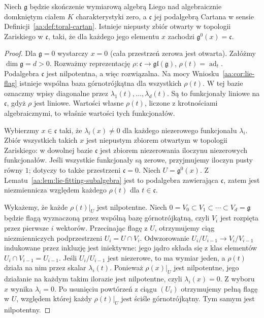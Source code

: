 \begin{twierdzenie}
\label{aa:tw:cartan-generic-fitting}
Niech $\mathfrak g$ będzie skończenie wymiarową algebrą Liego nad algebraicznie domkniętym ciałem $K$ charakterystyki zero, a $\mathfrak c$ jej podalgebrą Cartana w sensie Definicji~\ref{aa:def:toral-cartan}. Istnieje niepusty zbiór otwarty w topologii Zariskiego w $\mathfrak c$, taki, że dla każdego jego elementu $x$ zachodzi
$\mathfrak g^0(x)=\mathfrak c$.
\end{twierdzenie}
\begin{proof}
Dla $\mathfrak g=0$ wystarczy $x=0$ (cała przestrzeń zerowa jest otwarta). Załóżmy $\dim\mathfrak g=d>0$. Rozważmy reprezentację $\rho:\mathfrak c\to\mathfrak{gl}(\mathfrak g)$, $\rho(t)=\operatorname{ad}_t$. Podalgebra $\mathfrak c$ jest nilpotentna, a więc rozwiązalna. Na mocy Wniosku~\ref{aa:cor:lie-flag} istnieje wspólna baza górnotrójkątna dla wszystkich $\rho(t)$. W tej bazie oznaczmy wpisy diagonalne przez $\lambda_1(t),\ldots,\lambda_d(t)$. Są to funkcjonały liniowe na $\mathfrak c$, gdyż $\rho$ jest liniowe. Wartości własne $\rho(t)$, liczone z krotnościami algebraicznymi, to właśnie wartości tych funkcjonałów.

Wybierzmy $x\in\mathfrak c$ taki, że $\lambda_i(x)\ne0$ dla każdego niezerowego funkcjonału $\lambda_i$. Zbiór wszystkich takich $x$ jest niepustym zbiorem otwartym w topologii Zariskiego: w dowolnej bazie $\mathfrak c$ jest zbiorem niezerowania iloczynu niezerowych funkcjonałów. Jeśli wszystkie funkcjonały są zerowe, przyjmujemy iloczyn pusty równy $1$; dotyczy to także przestrzeni $\mathfrak c=0$. Niech $U=\mathfrak g^0(x)$. Z Lematu~\ref{aa:lem:lie-fitting-subalgebra} jest to podalgebra zawierająca $\mathfrak c$, zatem jest niezmiennicza względem każdego $\rho(t)$ dla $t\in\mathfrak c$.

Wykażemy, że każde $\rho(t)|_U$ jest nilpotentne. Niech
$0=V_0\subset V_1\subset\cdots\subset V_d=\mathfrak g$
będzie flagą wyznaczoną przez wspólną bazę górnotrójkątną, czyli $V_i$ jest rozpięta przez pierwsze $i$ wektorów. Przecinając flagę z $U$, otrzymujemy ciąg niezmienniczych podprzestrzeni $U_i=U\cap V_i$. Odwzorowanie $U_i/U_{i-1}\to V_i/V_{i-1}$ indukowane przez inkluzję jest iniektywne: jego jądro składa się z klas elementów $U_i\cap V_{i-1}=U_{i-1}$. Jeśli $U_i/U_{i-1}$ jest niezerowe, to ma wymiar jeden, a $\rho(t)$ działa na nim przez skalar $\lambda_i(t)$. Ponieważ $\rho(x)|_U$ jest nilpotentne, jego działanie na każdym takim ilorazie jest nilpotentne, czyli $\lambda_i(x)=0$. Z wyboru $x$ wynika $\lambda_i=0$. Po usunięciu powtórzeń z ciągu $(U_i)$ otrzymujemy pełną flagę w $U$, względem której każdy $\rho(t)|_U$ jest ściśle górnotrójkątny. Tym samym jest nilpotentny.


\end{proof}
